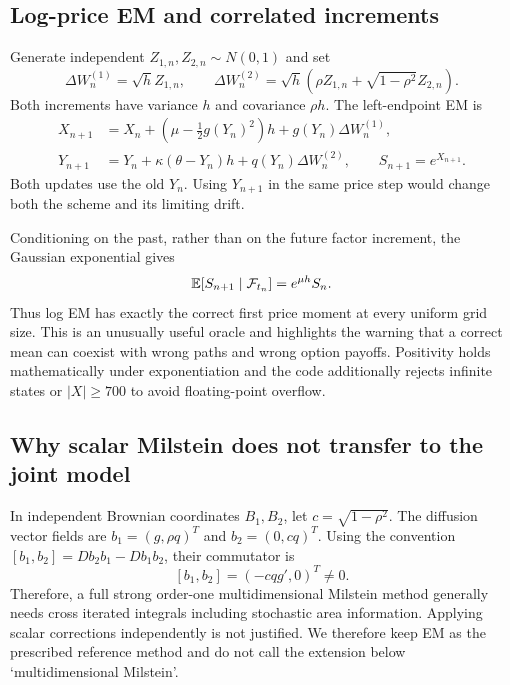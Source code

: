 \subsection{Log-price EM and correlated increments}
Generate independent $Z_{1,n},Z_{2,n}\sim N(0,1)$ and set
\begin{equation}
\Delta W_n^{(1)}=\sqrt h Z_{1,n},\qquad
\Delta W_n^{(2)}=\sqrt h(\rho Z_{1,n}+\sqrt{1-\rho^2}Z_{2,n}).
\end{equation}
Both increments have variance $h$ and covariance $\rho h$. The left-endpoint EM is
\begin{align}\label{eq:svem}
X_{n+1}&=X_n+(\mu-\tfrac12g(Y_n)^2)h+g(Y_n)\Delta W_n^{(1)},\\
Y_{n+1}&=Y_n+\kappa(\theta-Y_n)h+q(Y_n)\Delta W_n^{(2)},\qquad S_{n+1}=e^{X_{n+1}}.
\end{align}
Both updates use the old $Y_n$. Using $Y_{n+1}$ in the same price step would change both the scheme and its limiting drift.

Conditioning on the past, rather than on the future factor increment, the Gaussian exponential gives
\begin{equation}\label{eq:discmart}\mathbb E[S_{n+1}\mid\mathcal F_{t_n}]=e^{\mu h}S_n.
\end{equation}
Thus log EM has exactly the correct first price moment at every uniform grid size. This is an unusually useful oracle and highlights the warning that a correct mean can coexist with wrong paths and wrong option payoffs. Positivity holds mathematically under exponentiation and the code additionally rejects infinite states or $|X|\ge700$ to avoid floating-point overflow.

\subsection{Why scalar Milstein does not transfer to the joint model}
In independent Brownian coordinates $B_1,B_2$, let $c=\sqrt{1-\rho^2}$. The diffusion vector fields are $b_1=(g,\rho q)^T$ and $b_2=(0,cq)^T$. Using the convention $[b_1,b_2]=Db_2b_1-Db_1b_2$, their commutator is
\begin{equation}\label{eq:commutator}
[b_1,b_2]=(-c q g',0)^T\ne0.
\end{equation}
Therefore, a full strong order-one multidimensional Milstein method generally needs cross iterated integrals including stochastic area information. Applying scalar corrections independently is not justified. We therefore keep EM as the prescribed reference method and do not call the extension below `multidimensional Milstein'.

